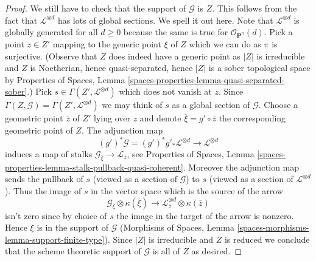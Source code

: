 \begin{proof}
\medskip\noindent
We still have to check that the support of $\mathcal{G}$ is $Z$.
This follows from the fact that $\mathcal{L}^{\otimes d}$ has
lots of global sections. We spell it out here.
Note that $\mathcal{L}^{\otimes d}$ is globally generated for all $d \geq 0$
because the same is true for $\mathcal{O}_{\mathbf{P}^n}(d)$.
Pick a point $z \in Z'$ mapping to the generic point $\xi$ of $Z$
which we can do as $\pi$ is surjective.
(Observe that $Z$ does indeed have a generic point as $|Z|$ is irreducible
and $Z$ is Noetherian, hence quasi-separated, hence $|Z|$ is a sober
topological space by
Properties of Spaces, Lemma
\ref{spaces-properties-lemma-quasi-separated-sober}.)
Pick $s \in \Gamma(Z', \mathcal{L}^{\otimes d})$ which does not vanish at $z$.
Since $\Gamma(Z, \mathcal{G}) = \Gamma(Z', \mathcal{L}^{\otimes d})$
we may think of $s$ as a global section of $\mathcal{G}$.
Choose a geometric point $\overline{z}$ of $Z'$ lying over $z$
and denote $\overline{\xi} = g' \circ \overline{z}$
the corresponding geometric point of $Z$. The adjunction map
$$
(g')^*\mathcal{G} =
(g')^*g'_*\mathcal{L}^{\otimes d} \longrightarrow \mathcal{L}^{\otimes d}
$$
induces a map of stalks
$\mathcal{G}_{\overline{\xi}} \to \mathcal{L}_{\overline{z}}$, see
Properties of Spaces, Lemma
\ref{spaces-properties-lemma-stalk-pullback-quasi-coherent}.
Moreover the adjunction map sends the pullback of $s$ (viewed as a section
of $\mathcal{G}$) to $s$ (viewed as a section of $\mathcal{L}^{\otimes d}$).
Thus the image of $s$ in the vector space which is the source of the arrow
$$
\mathcal{G}_{\overline{\xi}} \otimes \kappa(\overline{\xi})
\longrightarrow
\mathcal{L}^{\otimes d}_{\overline{z}} \otimes \kappa(\overline{z})
$$
isn't zero since by choice of $s$ the image in the target of the arrow
is nonzero. Hence $\xi$ is in the support of $\mathcal{G}$
(Morphisms of Spaces, Lemma \ref{spaces-morphisms-lemma-support-finite-type}).
Since $|Z|$ is irreducible and $Z$ is reduced we conclude that
the scheme theoretic support of $\mathcal{G}$ is all of $Z$ as desired.
\end{proof}

